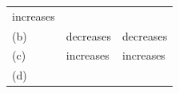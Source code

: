 \begin{enumerate}[noitemsep, label=\textbf{\arabic*}. ]
\begin{enumerate}[noitemsep, label=\textbf{\alph*}. ]
{{\begin{center}
\begin{tabular}[t]{|l|l|l|}
        increases%
     \tabularnewline\cline{1-1}\cline{2-2}\cline{3-3}
    
    
        (b) &
    
    
        decreases &
    
    
        decreases%
     \tabularnewline\cline{1-1}\cline{2-2}\cline{3-3}
    
    
        (c) &
    
    
        increases &
    
    
        increases%
     \tabularnewline\cline{1-1}\cline{2-2}\cline{3-3}
    
    
        (d) &
    

\end{tabular}
\end{center}}}
\end{enumerate}
\end{enumerate}
